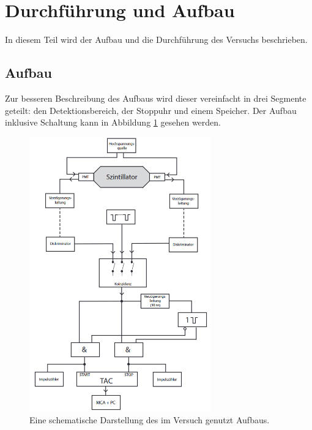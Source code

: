 \newpage
\section{Durchführung und Aufbau}
\label{sec:durchfuerung}
In diesem Teil wird der Aufbau und die Durchführung des Versuchs beschrieben.
\FloatBarrier
\subsection{Aufbau}
Zur besseren Beschreibung des Aufbaus wird dieser vereinfacht in drei Segmente geteilt: den Detektionsbereich, der Stoppuhr und einem Speicher.
Der Aufbau inklusive Schaltung kann in Abbildung \ref{fig:aufbau} gesehen werden.
\begin{figure}
    \centering
    \includegraphics[width=0.7\textwidth]{data/aufbau.png}
    \caption{Eine schematische Darstellung des im Versuch genutzt Aufbaus. \cite{V01}}
    \label{fig:aufbau}
\end{figure}
\FloatBarrier
